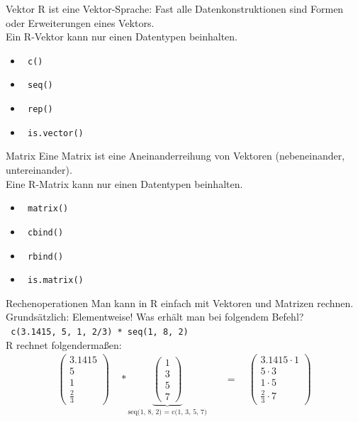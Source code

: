 \documentclass[xcolor=dvipsnames, aspectratio = 169]{beamer}
\begin{document}
\begin{frame}[fragile]{Vektor}
	R ist eine Vektor-Sprache: Fast alle Datenkonstruktionen sind Formen oder Erweiterungen eines Vektors. \\
	Ein R-Vektor kann nur einen Datentypen beinhalten.
	\begin{itemize}
		\item \verb+ c()+
		\item \verb+ seq()+
		\item \verb+ rep()+
		\item \verb+ is.vector()+
	\end{itemize}
\end{frame}

\begin{frame}[fragile]{Matrix}
	Eine Matrix ist eine Aneinanderreihung von Vektoren (nebeneinander, untereinander). \\
	Eine R-Matrix kann nur einen Datentypen beinhalten.
	\begin{itemize}
		\item \verb+ matrix()+
		\item \verb+ cbind()+
		\item \verb+ rbind()+
		\item \verb+ is.matrix()+
	\end{itemize}
\end{frame}

\begin{frame}[fragile]{Rechenoperationen}
Man kann in R einfach mit Vektoren und Matrizen rechnen.  Grundsätzlich: Elementweise! Was erhält man bei folgendem Befehl? \\
\verb+ c(3.1415, 5, 1, 2/3) * seq(1, 8, 2)+ \\
R rechnet folgendermaßen: \begin{align*}
	\begin{pmatrix}
	3.1415 \\ 5 \\ 1 \\ \frac{2}{3}
	\end{pmatrix} \quad * 
	\underbrace{\begin{pmatrix}
		1 \\ 3 \\ 5 \\ 7
	\end{pmatrix}}_{\text{seq(1, 8, 2) = c(1, 3, 5, 7)}}
	\quad &= \quad \begin{pmatrix}
	3.1415 \cdot 1 \\
	5 \cdot 3 \\
	1 \cdot 5 \\
	\frac{2}{3} \cdot 7
	\end{pmatrix}
\end{align*}
\end{frame}
\end{document}
